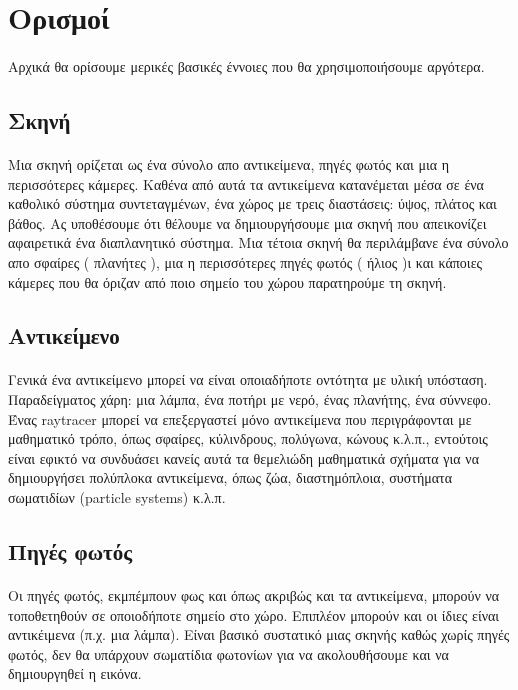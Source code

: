 \begin{sloppypar}
\section{Ορισμοί}
\paragraph{}
	Αρχικά θα ορίσουμε μερικές βασικές έννοιες που θα χρησιμοποιήσουμε αργότερα.

\subsection{Σκηνή}
\paragraph{}
	Μια σκηνή ορίζεται ως ένα σύνολο απο αντικείμενα, πηγές φωτός και μια η περισσότερες κάμερες.
Καθένα από αυτά τα αντικείμενα κατανέμεται μέσα σε ένα καθολικό σύστημα συντεταγμένων, ένα χώρος με 
τρεις διαστάσεις: ύψος, πλάτος και βάθος. Ας υποθέσουμε ότι θέλουμε να δημιουργήσουμε μια σκηνή που 
απεικονίζει αφαιρετικά ένα διαπλανητικό σύστημα. Μια τέτοια σκηνή θα περιλάμβανε ένα σύνολο απο 
σφαίρες ( πλανήτες ), μια η περισσότερες πηγές φωτός ( ήλιος )ι και κάποιες κάμερες που θα όριζαν 
από ποιο σημείο του χώρου παρατηρούμε τη σκηνή.

\subsection{Αντικείμενο}
\paragraph{}
	Γενικά ένα αντικείμενο μπορεί να είναι οποιαδήποτε οντότητα με υλική υπόσταση. Παραδείγματος χάρη: 
μια λάμπα, ένα ποτήρι με νερό, ένας πλανήτης, ένα σύννεφο. Ένας raytracer μπορεί να επεξεργαστεί μόνο 
αντικείμενα που περιγράφονται με μαθηματικό τρόπο, όπως σφαίρες, κύλινδρους, πολύγωνα, κώνους κ.λ.π., 
εντούτοις είναι εφικτό να συνδυάσει κανείς αυτά τα θεμελιώδη μαθηματικά σχήματα για να δημιουργήσει 
πολύπλοκα αντικείμενα, όπως ζώα, διαστημόπλοια, συστήματα σωματιδίων (particle systems) κ.λ.π.

\subsection{Πηγές φωτός}
\paragraph{}
	Οι πηγές φωτός, εκμπέμπουν φως και όπως ακριβώς και τα αντικείμενα, μπορούν να τοποθετηθούν σε
οποιοδήποτε σημείο στο χώρο. Επιπλέον μπορούν και οι ίδιες είναι αντικέιμενα (π.χ. μια λάμπα). Είναι βασικό 
συστατικό μιας σκηνής καθώς χωρίς πηγές φωτός, δεν θα υπάρχουν σωματίδια φωτονίων για να ακολουθήσουμε και 
να δημιουργηθεί η εικόνα.


\end{sloppypar}
